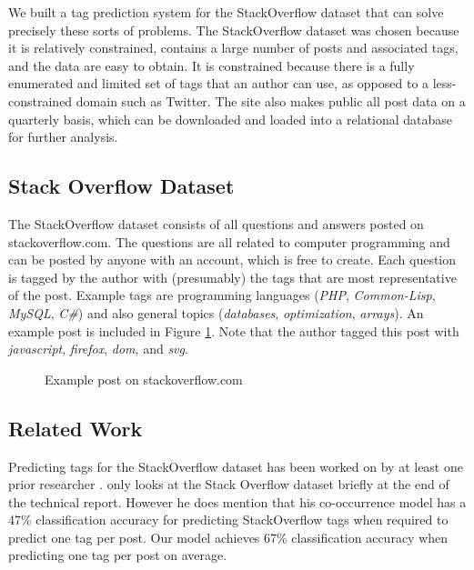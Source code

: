 \documentclass[10pt,letterpaper]{article}
\begin{document}
We built a tag prediction system for the StackOverflow dataset that can solve precisely these sorts of problems.
The StackOverflow dataset was chosen because it is relatively constrained, contains a large number of posts and associated tags, and the data are easy to obtain.
It is constrained because there is a fully enumerated and limited set of tags that an author can use, as opposed to a less-constrained domain such as Twitter.
The site also makes public all post data on a quarterly basis, which can be downloaded and loaded into a relational database for further analysis.

\subsection{Stack Overflow Dataset}

The StackOverflow dataset consists of all questions and answers posted on stackoverflow.com.
The questions are all related to computer programming and can be posted by anyone with an account, which is free to create.
Each question is tagged by the author with (presumably) the tags that are most representative of the post.
Example tags are programming languages (\emph{PHP}, \emph{Common-Lisp}, \emph{MySQL}, \emph{C\#}) and also general topics (\emph{databases}, \emph{optimization}, \emph{arrays}).
An example post is included in Figure \ref{fig:examplePost}.
Note that the author tagged this post with \emph{javascript}, \emph{firefox}, \emph{dom}, and \emph{svg}.

\begin{figure}[ht]
  \centering
  \caption{Example post on stackoverflow.com}
  \label{fig:examplePost}
\end{figure}

\subsection{Related Work}

Predicting tags for the StackOverflow dataset has been worked on by at least one prior researcher \cite{Kuo2011}.
\citeauthor{Kuo2011} only looks at the Stack Overflow dataset briefly at the end of the technical report.
However he does mention that his co-occurrence model has a 47\% classification accuracy for predicting StackOverflow tags when required to predict one tag per post.
Our model achieves 67\% classification accuracy when predicting one tag per post on average.
\end{document}

